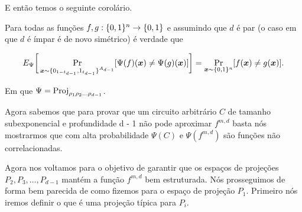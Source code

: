E então temos o seguinte corolário.

\begin{cor} \label{complete_to_uniform_cor}
Para todas as funções $f, g: \{0, 1\}^{n} \to \{0, 1\}$ e assumindo que $d$ é par (o caso em que $d$ é ímpar é de novo simétrico) é verdade que

\begin{equation*}
E_{\Psi} \bigg[ \Pr_{\boldsymbol{x} \sim \{0_{1 - t_{d - 1}}, 1_{t_{d - 1}}\}^{A_{d - 1}}}[\Psi(f)(\boldsymbol{x}) \neq \Psi(g)(\boldsymbol{x})] \bigg] = \Pr_{\boldsymbol{x} \sim \{0, 1\}^{n}}[f(\boldsymbol{x}) \neq g(\boldsymbol{x})].
\end{equation*}

Em que $\Psi = \text{Proj}_{\rho_{1}\rho_{2}\dots\rho_{d - 1}}$.

\end{cor}

Agora sabemos que para provar que um circuito arbitrário $C$ de tamanho subexponencial e profundidade d - 1 não pode aproximar $f^{m, d}$ basta nós mostrarmos que com alta probabilidade $\Psi(C)$ e $\Psi(f^{m, d})$ são funções não correlacionadas.

Agora nos voltamos para o objetivo de garantir que os espaços de projeções $P_{2}, P_{3}, \dots, P_{d - 1}$ mantém a função $f^{m, d}$ bem estruturada. Nós prosseguimos de forma bem parecida de como fizemos para o espaço de projeção $P_{1}$. Primeiro nós iremos definir o que é uma projeção típica para $P_{i}$.

